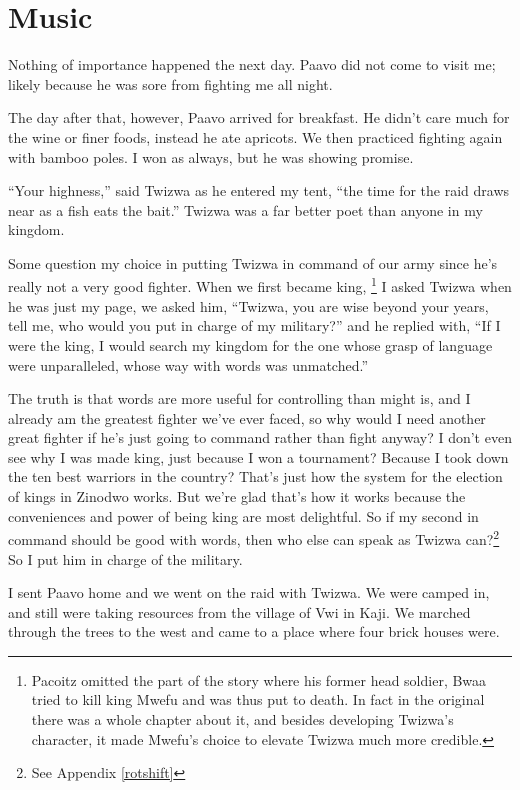 \chapter{Music}

Nothing of importance happened the next day. Paa\-vo did not come to visit me; likely because he was sore from fighting me all night.

The day after that, however, Paa\-vo arrived for breakfast. He didn't care much for the wine or finer foods, instead he ate apricots. We then practiced fighting again with bamboo poles. I won as always, but he was showing promise.

``Your highness,'' said Twi\-zwa as he entered my tent, ``the time for the raid draws near as a fish eats the bait.'' Twi\-zwa was a far better poet than anyone in my kingdom.

Some question my choice in putting Twi\-zwa in command of our army since he's really not a very good fighter. When we first became king,
\footnote{Pa\-co\-itz omitted the part of the story where his former head soldier, Bwaa tried to kill king Mwe\-fu and was thus put to death. In fact in the original there was a whole chapter about it, and besides developing Twi\-zwa's character, it made Mwe\-fu's choice to elevate Twi\-zwa much more credible.}
I asked Twi\-zwa when he was just my page, we asked him, ``Twi\-zwa, you are wise beyond your years, tell me, who would you put in charge of my military?'' and he replied with, ``If I were the king, I would search my kingdom for the one whose grasp of language were unparalleled, whose way with words was unmatched.''

The truth is that words are more useful for controlling than might is, and I already am the greatest fighter we've ever faced, so why would I need another great fighter if he's just going to command rather than fight anyway? I don't even see why I was made king, just because I won a tournament? Because I took down the ten best warriors in the country? That's just how the system for the election of kings in Zi\-no\-dwo works. But we're glad that's how it works because the conveniences and power of being king are most delightful.
So if my second in command should be good with words, then who else can speak as Twi\-zwa can?\footnote{See Appendix \ref{rotshift}} So I put him in charge of the military.

I sent Paa\-vo home and we went on the raid with Twi\-zwa. We were camped in, and still were taking resources from the village of Vwi in Ka\-ji. We marched through the trees to the west and came to a place where four brick houses were.

